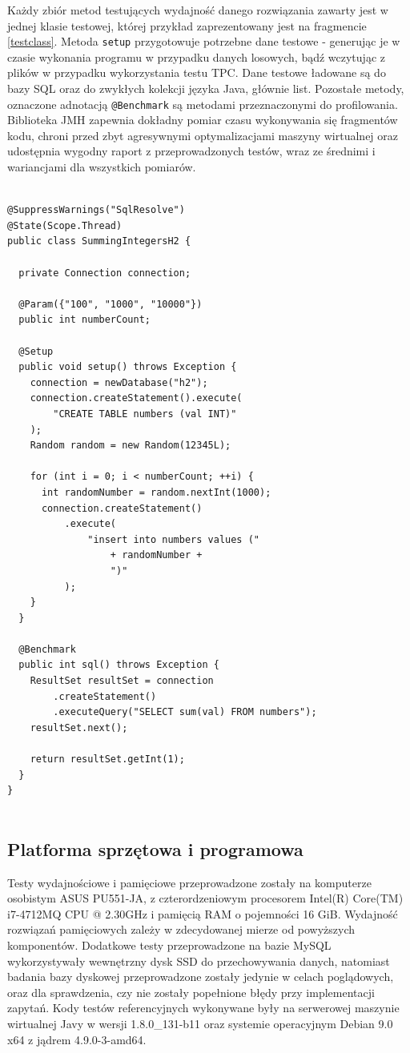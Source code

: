 \documentclass[12pt]{extarticle}
\begin{document}
    Każdy zbiór metod testujących wydajność danego rozwiązania zawarty jest w jednej klasie testowej, której przykład zaprezentowany jest na fragmencie \ref{testclass}. Metoda \texttt{setup} przygotowuje potrzebne dane testowe - generując je w czasie wykonania programu w przypadku danych losowych, bądź wczytując z plików w przypadku wykorzystania testu TPC. Dane testowe ładowane są do bazy SQL oraz do zwykłych kolekcji języka Java, głównie list. Pozostałe metody, oznaczone adnotacją \texttt{@Benchmark} są metodami przeznaczonymi do profilowania. Biblioteka JMH zapewnia dokładny pomiar czasu wykonywania się fragmentów kodu, chroni przed zbyt agresywnymi optymalizacjami maszyny wirtualnej oraz udostępnia wygodny raport z przeprowadzonych testów, wraz ze średnimi i wariancjami dla wszystkich pomiarów.

\begin{lstlisting}[label=testclass, caption=Przykładowa klasa JMH]

@SuppressWarnings("SqlResolve")
@State(Scope.Thread)
public class SummingIntegersH2 {
  
  private Connection connection;
  
  @Param({"100", "1000", "10000"})
  public int numberCount;
  
  @Setup
  public void setup() throws Exception {
    connection = newDatabase("h2");
    connection.createStatement().execute(
        "CREATE TABLE numbers (val INT)"
    );
    Random random = new Random(12345L);
    
    for (int i = 0; i < numberCount; ++i) {
      int randomNumber = random.nextInt(1000);
      connection.createStatement()
          .execute(
              "insert into numbers values ("
                  + randomNumber +
                  ")"
          );
    }
  }
  
  @Benchmark
  public int sql() throws Exception {
    ResultSet resultSet = connection
        .createStatement()
        .executeQuery("SELECT sum(val) FROM numbers");
    resultSet.next();
    
    return resultSet.getInt(1);
  }
}


\end{lstlisting}

\subsection{Platforma sprzętowa i programowa}

    Testy wydajnościowe i pamięciowe przeprowadzone zostały na komputerze osobistym ASUS PU551-JA, z czterordzeniowym procesorem Intel(R) Core(TM) i7-4712MQ CPU @ 2.30GHz i pamięcią RAM o pojemności 16 GiB. Wydajność rozwiązań pamięciowych zależy w zdecydowanej mierze od powyższych komponentów. Dodatkowe testy przeprowadzone na bazie MySQL wykorzystywały wewnętrzny dysk SSD  do przechowywania danych, natomiast badania bazy dyskowej przeprowadzone zostały jedynie w celach poglądowych, oraz dla sprawdzenia, czy nie zostały popełnione błędy przy implementacji zapytań. Kody testów referencyjnych wykonywane były na serwerowej maszynie wirtualnej Javy w wersji 1.8.0\_131-b11 oraz systemie operacyjnym Debian 9.0 x64 z jądrem 4.9.0-3-amd64.
\end{document}

